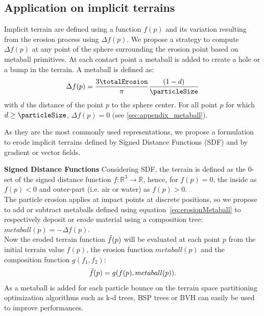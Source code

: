 \subsection{Application on implicit terrains}
\label{sec:application_on_implicit}
Implicit terrain are defined using a function $f(p)$ and its variation resulting from the erosion process using $\Delta f(p)$.
We propose a strategy to compute $\Delta f(p)$ at any point of the sphere surrounding the erosion point based on metaball primitives. At each contact point a metaball is added to create a hole or a bump in the terrain. A metaball is defined as: 
\begin{align}\label{eq:erosionMetaball}
\Delta f(p) = \frac{3 \totalErosion}{\pi} \frac{(1 - d)}{\particleSize}
\end{align}
with $d$ the distance of the point $p$ to the sphere center. For all point $p$ for which $d \geq \particleSize$, $\Delta f(p) = 0$ (see \ref{sec:appendix_metaball}).

As they are the most commonly used representations, we propose a formulation to erode implicit terrains defined by Signed Distance Functions (SDF) and by gradient or vector fields.

\textbf{Signed Distance Functions}
\label{sec:application_on_sdf}
Considering SDF, the terrain is defined as the 0-set of the signed distance function $f: \mathbb{R}^3 \rightarrow \mathbb{R}$, hence, for $f(p) = 0$, the inside as $f(p) < 0$ and outer-part (i.e. air or water) as $f(p) > 0$. \\ 
The particle erosion applies at impact points at discrete positions, so we propose to add or subtract metaballs defined using equation~\eqref{eq:erosionMetaball} to respectively deposit or erode material using a composition tree:\\ $metaball(p) = -\Delta f(p)$.\\
Now the eroded terrain function $\Tilde{f}(p)$ will be evaluated at each point $p$ from the initial terrain value $f(p)$, the erosion function $metaball(p)$ and the composition function $g(f_1, f_2)$:
\begin{align} \label{eq:finalMetaball}
\Tilde{f}(p) = g(f(p), metaball(p)).  \nonumber
\end{align}
As a metaball is added for each particle bounce on the terrain space partitioning optimization algorithms such as k-d trees, BSP trees or BVH can easily be used to improve performances.


